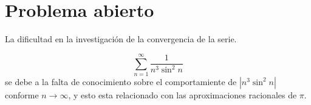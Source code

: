 \documentclass{article} %
\begin{document}
 \section{Problema abierto}
La dificultad en la investigaci\'on de la convergencia de la serie.

	$$\sum_{n=1}^\infty\frac{1}{n^3\sin^2n}$$
se debe a la falta de conocimiento sobre el comportamiente
de $|n^3\sin^2 n|$ conforme $n \rightarrow \infty$,
y esto esta relacionado con las aproximaciones racionales 
de $\pi$.
\end{document}
